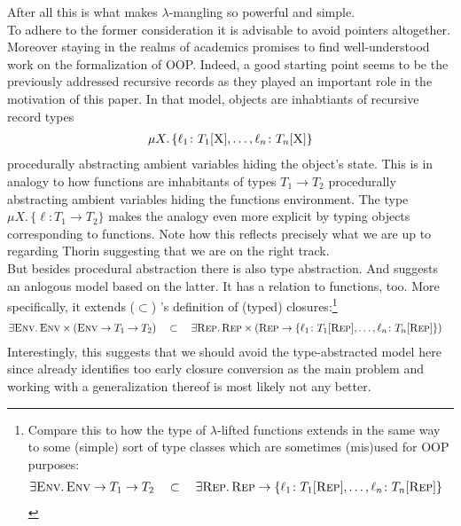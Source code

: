 After all this is what makes $\lambda$-mangling so powerful and simple.
\\
To adhere to the former consideration it is advisable to avoid pointers altogether.
Moreover staying in the realms of academics promises to find well-understood work on the formalization of OOP.
Indeed, a good starting point seems to be the previously addressed recursive records as they played an important role in the motivation of this paper.
In that model, objects are inhabtiants of recursive record types
\begin{align*}
  \mu X
  .\,
  \lbrace
    \ell_{1} \colon T_{1}[\textsc{X}],
    \ldots,
    \ell_{n} \colon T_{n}[\textsc{X}]
  \rbrace
\end{align*}
procedurally abstracting ambient variables hiding the object's state.
This is in analogy to how functions are inhabitants of types $T_{1} \to T_{2}$ procedurally abstracting ambient variables hiding the functions environment.
The type $\mu X.\, \lbrace \ell \colon T_{1} \to T_{2} \rbrace$ makes the analogy even more explicit by typing objects corresponding to functions.
Note how this reflects precisely what we are up to regarding Thorin suggesting that we are on the right track.
\\
But besides procedural abstraction there is also type abstraction.
And \cite{pierce} suggests an anlogous model based on the latter.
It has a relation to functions, too.
More specifically, it extends ($\subset$) \cite{harper}'s definition of (typed) closures:\footnote{
  Compare this to how the type of $\lambda$-lifted functions extends in the same way to some (simple) sort of type classes which are sometimes (mis)used for OOP purposes:
\begin{align*}
  \exists
  \textsc{Env}
  .\,
  \textsc{Env} \to T_{1} \to T_{2}
  \quad
  &\subset
  \quad
  \exists
  \textsc{Rep}
  .\,
  \textsc{Rep}
  \to
  \lbrace
    \ell_{1} \colon T_{1}[\textsc{Rep}],
    \ldots,
    \ell_{n} \colon T_{n}[\textsc{Rep}]
  \rbrace
\end{align*}
}
\begin{align*}
  \exists
  \textsc{Env}
  .\,
  \textsc{Env}
  \times
  \left(
    \textsc{Env} \to T_{1} \to T_{2}
  \right)
  \quad
  &\subset
  \quad
  \exists
  \textsc{Rep}
  .\,
  \textsc{Rep}
  \times
  \left(
    \textsc{Rep}
    \to
    \lbrace
      \ell_{1} \colon T_{1}[\textsc{Rep}],
      \ldots,
      \ell_{n} \colon T_{n}[\textsc{Rep}]
    \rbrace
  \right)
\end{align*}
Interestingly, this suggests that we should avoid the type-abstracted model here since \cite{thorin} already identifies too early closure conversion as the main problem and working with a generalization thereof is most likely not any better.
